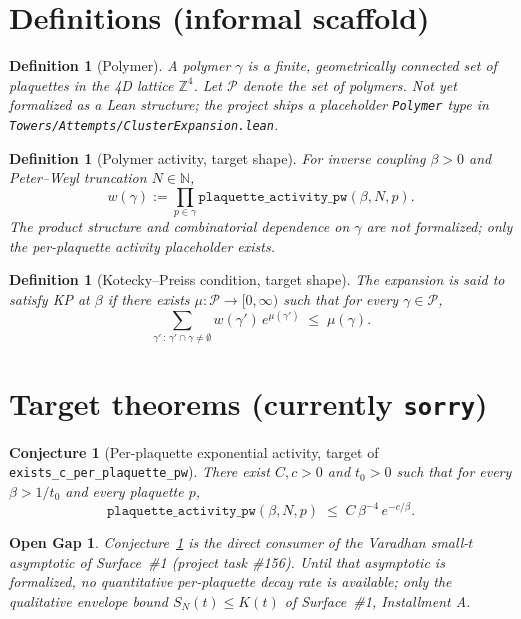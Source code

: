 \documentclass{article}
\newtheorem{definition}[theorem]{Definition}
\newtheorem*{opengap}{Open Gap}
\newtheorem*{conjecture}{Conjecture}
\begin{document}
\section{Definitions (informal scaffold)}

\begin{definition}[Polymer]
A polymer $\gamma$ is a finite, geometrically connected set of
plaquettes in the 4D lattice $\mathbb{Z}^4$. Let $\mathcal{P}$
denote the set of polymers. \emph{Not yet formalized as a Lean
structure; the project ships a placeholder \texttt{Polymer} type in
\texttt{Towers/Attempts/ClusterExpansion.lean}.}
\end{definition}

\begin{definition}[Polymer activity, target shape]
For inverse coupling $\beta>0$ and Peter--Weyl truncation
$N\in\mathbb{N}$,
\[
  w(\gamma) := \prod_{p \in \gamma}
    \texttt{plaquette\_activity\_pw}(\beta, N, p).
\]
\emph{The product structure and combinatorial dependence on $\gamma$
are not formalized; only the per-plaquette activity placeholder
exists.}
\end{definition}

\begin{definition}[Kotecky--Preiss condition, target shape]
The expansion is said to satisfy KP at $\beta$ if there exists
$\mu:\mathcal{P}\to[0,\infty)$ such that for every
$\gamma\in\mathcal{P}$,
\[
  \sum_{\gamma' \,:\, \gamma' \cap \gamma \neq \emptyset}
    w(\gamma')\, e^{\mu(\gamma')} \;\le\; \mu(\gamma).
\]
\end{definition}

\section{Target theorems (currently \texttt{sorry})}

\begin{conjecture}[Per-plaquette exponential activity, target of
\texttt{exists\_c\_per\_plaquette\_pw}]
\label{conj:activity}
There exist $C,c>0$ and $t_0>0$ such that for every $\beta>1/t_0$
and every plaquette $p$,
\[
  \texttt{plaquette\_activity\_pw}(\beta, N, p)
    \;\le\; C\,\beta^{-4}\, e^{-c/\beta}.
\]
\end{conjecture}

\begin{opengap}
Conjecture~\ref{conj:activity} is the direct consumer of the
Varadhan small-$t$ asymptotic of Surface~\#1
(project task \#156). Until that asymptotic is formalized, no
quantitative per-plaquette decay rate is available; only the
qualitative envelope bound $S_N(t)\le K(t)$ of
Surface~\#1, Installment A.
\end{opengap}
\end{document}
